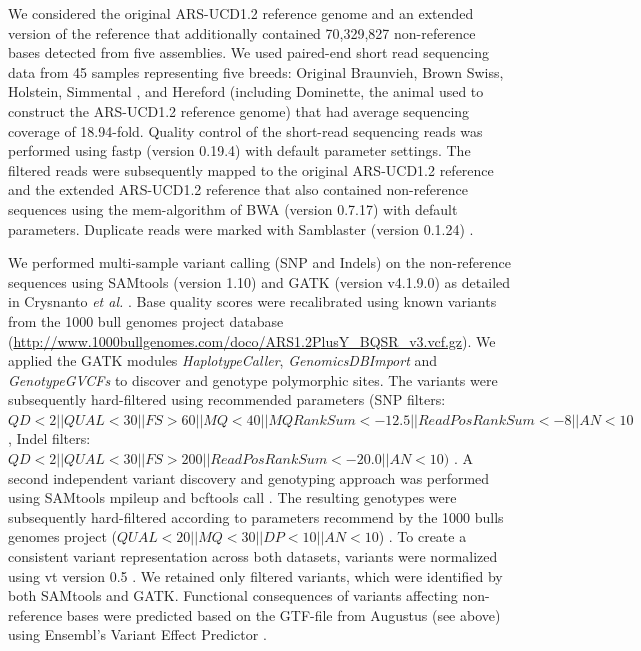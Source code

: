 \documentclass[../main.tex]{subfiles}
\begin{document}
We considered the original ARS-UCD1.2 reference genome and an extended version of the reference that additionally contained 70,329,827 non-reference bases detected from five assemblies. We used paired-end short read sequencing data from 45 samples representing five breeds: Original Braunvieh, Brown Swiss, Holstein, Simmental \citep{hafliger2020il17ra}, and Hereford (including Dominette, the animal used to construct the ARS-UCD1.2 reference genome) \citep{rosen2020novo,young2020genomic} that had average sequencing coverage of 18.94-fold. Quality control of the short-read sequencing reads was performed using fastp (version 0.19.4) \citep{chen2018fastp} with default parameter settings. The filtered reads were subsequently mapped to the original ARS-UCD1.2 reference and the extended ARS-UCD1.2 reference that also contained non-reference sequences using the mem-algorithm of BWA (version 0.7.17) \citep{li2013aligning} with default parameters. Duplicate reads were marked with Samblaster (version 0.1.24) \citep{faust2014samblaster}. 

We performed multi-sample variant calling (SNP and Indels) on the non-reference sequences using SAMtools (version 1.10) \citep{li2009sequence} and GATK (version v4.1.9.0) \citep{poplin2018scaling} as detailed in Crysnanto \emph{ et al.} \citep{crysnanto2019accurate}. Base quality scores were recalibrated using known variants from the 1000 bull genomes project database (\url{http://www.1000bullgenomes.com/doco/ARS1.2PlusY_BQSR_v3.vcf.gz}). We applied the GATK modules \emph{HaplotypeCaller}, \emph{GenomicsDBImport} and \emph{GenotypeGVCFs} to discover and genotype polymorphic sites. The variants were subsequently hard-filtered using recommended parameters (SNP filters: $QD < 2 || QUAL < 30 || FS > 60 || MQ < 40 || MQRankSum < -12.5 || ReadPosRankSum < -8 || AN < 10$, Indel filters: $QD < 2 || QUAL < 30 || FS > 200 || ReadPosRankSum < -20.0 || AN < 10)$ \citep{crysnanto2019accurate}. A second independent variant discovery and genotyping approach was performed using SAMtools mpileup and bcftools call \citep{li2009sequence}. The resulting genotypes were subsequently hard-filtered according to parameters recommend by the 1000 bulls genomes project ($QUAL < 20 || MQ < 30 || DP < 10 || AN < 10$) \citep{daetwyler2014whole}. To create a consistent variant representation across both datasets, variants were normalized using vt version 0.5 \citep{tan2015unified}. We retained only filtered variants, which were identified by both SAMtools and GATK. Functional consequences of variants affecting non-reference bases were predicted based on the GTF-file from Augustus (see above) using Ensembl’s Variant Effect Predictor \citep{mclaren2016ensembl}.
\end{document}
